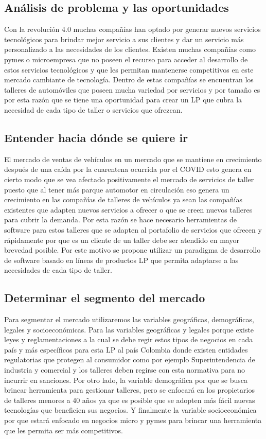 \documentclass[10pt,a4paper,openany]{book}
\begin{document}
\subsection{Análisis de problema y las oportunidades}

Con la revolución 4.0 muchas compañías han optado por generar nuevos servicios tecnológicos para brindar mejor servicio a sus clientes y dar un servicio más personalizado a las necesidades de los clientes. Existen muchas compañías como pymes o microempresa que no poseen el recurso para acceder al desarrollo de estos servicios tecnológicos y que les permitan mantenerse competitivos en este mercado cambiante de tecnología. Dentro de estas compañías se encuentran los talleres de automóviles que poseen mucha variedad por servicios y por tamaño es por esta razón que se tiene una oportunidad para crear un LP que cubra la necesidad de cada tipo de taller o servicios que ofrezcan.

\subsection{Entender hacia dónde se quiere ir}

El mercado de ventas de vehículos en un mercado que se mantiene en crecimiento después de una caída por la cuarentena ocurrida por el COVID esto genera en cierto modo que se vea afectado positivamente el mercado de servicios de taller puesto que al tener más parque automotor en circulación eso genera un crecimiento en las compañías de talleres de vehículos ya sean las compañías existentes que adapten nuevos servicios a ofrecer o que se creen nuevos talleres para cubrir la demanda. Por esta razón se hace necesario herramientas de software para estos talleres que se adapten al portafolio de servicios que ofrecen y rápidamente por que es un cliente de un taller debe ser atendido en mayor brevedad posible. Por este motivo se propone utilizar un paradigma de desarrollo de software basado en líneas de productos LP que permita adaptarse a las necesidades de cada tipo de taller.

\subsection{Determinar el segmento del mercado}

Para segmentar el mercado utilizaremos las variables geográficas, demográficas, legales y socioeconómicas. Para las variables geográficas y legales porque existe leyes y reglamentaciones a la cual se debe regir estos tipos de negocios en cada país y más específicos para esta LP al país Colombia donde existen entidades regulatorias que protegen al consumidor como por ejemplo Superintendencia de industria y comercial y los talleres deben regirse con esta normativa para no incurrir en sanciones.
Por otro lado, la variable demográfica por que se busca brincar herramienta para gestionar talleres, pero se enfocará en los propietarios de talleres menores a 40 años ya que es posible que se adopten más fácil nuevas tecnologías que beneficien sus negocios.
Y finalmente la variable socioeconómica por que estará enfocado en negocios micro y pymes para brincar una herramienta que les permita ser más competitivos.
\end{document}
